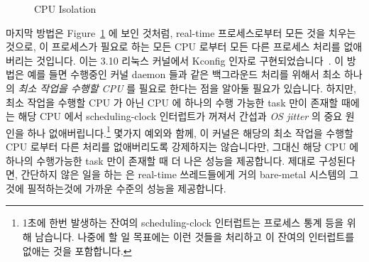 \begin{figure}[tb]
\centering
{}
\caption{CPU Isolation}
\label{fig:advsync:CPU Isolation}
\end{figure}

마지막 방법은
Figure~\ref{fig:advsync:CPU Isolation} 에 보인 것처럼, real-time 프로세스로부터 모든
것을 치우는 것으로, 이 프로세스가 필요로 하는 모든 CPU 로부터 모든 다른
프로세스 처리를 없애버리는 것입니다.
이는 3.10 리눅스 커널에서  Kconfig 인자로
구현되었습니다~\cite{FredericWeisbecker2013nohz}.
이 방법은 예를 들면 수행중인 커널 daemon 들과 같은 백그라운드 처리를 위해서
최소 하나의 \emph{최소 작업을 수행할 CPU} 를 필요로 한다는 점을 알아둘 필요가
있습니다.
하지만, 최소 작업을 수행할 CPU 가 아닌 CPU 에 하나의 수행 가능한 task 만이
존재할 때에는 해당 CPU 에서 scheduling-clock 인터럽트가 꺼져서 간섭과 \emph{OS
jitter} 의 중요 원인을 하나 없애버립니다.\footnote{
	1초에 한번 발생하는 잔여의 scheduling-clock 인터럽트는 프로세스 통계
	등을 위해 남습니다.
	나중에 할 일 목표에는 이런 것들을 처리하고 이 잔여의 인터럽트를 없애는
	것을 포함합니다.}
몇가지 예외와 함께, 이 커널은 해당의 최소 작업을 수행할 CPU 로부터 다른 처리를
없애버리도록 강제하지는 않습니다만, 그대신 해당 CPU 에 하나의 수행가능한 task
만이 존재할 때 더 나은 성능을 제공합니다.
제대로 구성된다면, 간단하지 않은 일을 하는  은 real-time
쓰레드들에게 거의 bare-metal 시스템의 그것에 필적하는것에 가까운 수준의 성능을
제공합니다.
\iffalse

